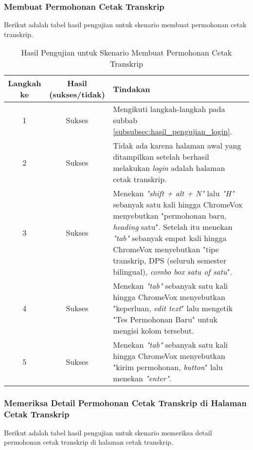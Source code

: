 \subsubsection{Membuat Permohonan Cetak Transkrip}
\label{subsubsec:hasil_pengujian_membuat_permohonan_cetak_transkrip}
Berikut adalah tabel hasil pengujian untuk skenario membuat permohonan cetak transkrip.

\begin{table}[H]
    \centering 
    \caption{Hasil Pengujian untuk Skenario Membuat Permohonan Cetak Transkrip}
    \label{tab:hasil_pengujian_membuat_permohonan_cetak_transkrip}
    \begin{tabular}{|c|c|p{10cm}|}
        \toprule
        Langkah ke & Hasil (sukses/tidak) & Tindakan \\

        \midrule
        1 & Sukses & Mengikuti langkah-langkah pada subbab \ref{subsubsec:hasil_pengujian_login}. \\
        2 & Sukses & Tidak ada karena halaman awal yang ditampilkan setelah berhasil melakukan \textit{login} adalah halaman cetak transkrip. \\
        3 & Sukses & Menekan \textit{"shift + alt + N"} lalu \textit{"H"} sebanyak satu kali hingga ChromeVox menyebutkan "permohonan baru, \textit{heading} satu". Setelah itu menekan \textit{"tab"} sebanyak empat kali hingga ChromeVox menyebutkan "tipe transkrip, DPS (seluruh semester bilingual), \textit{combo box satu of satu}". \\
        4 & Sukses & Menekan \textit{"tab"} sebanyak satu kali hingga ChromeVox menyebutkan "keperluan, \textit{edit text}" lalu mengetik "Tes Permohonan Baru" untuk mengisi kolom tersebut. \\
        5 & Sukses & Menekan \textit{"tab"} sebanyak satu kali hingga ChromeVox menyebutkan "kirim permohonan, \textit{button}" lalu menekan \textit{"enter"}. \\

        \bottomrule

    \end{tabular}
\end{table}

\subsubsection{Memeriksa Detail Permohonan Cetak Transkrip di Halaman Cetak Transkrip}
\label{subsubsec:hasil_pengujian_memeriksa_detail_permohonan_cetak_transkrip_di_halaman_cetak_transkrip}
Berikut adalah tabel hasil pengujian untuk skenario memeriksa detail permohonan cetak transkrip di halaman cetak transkrip.

